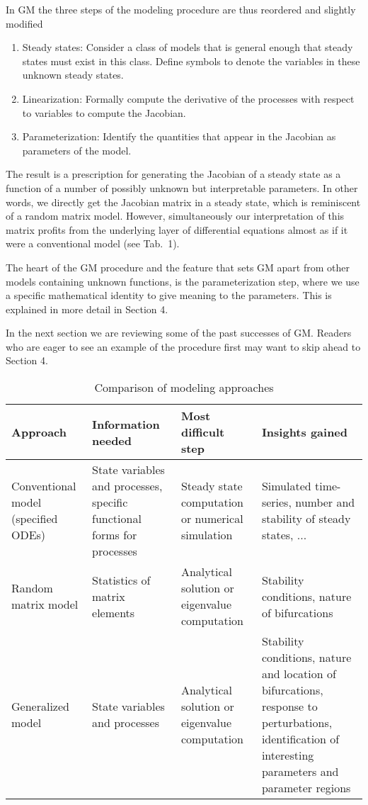 \documentclass{article}
\begin{document}
In GM the three steps of the modeling procedure are thus reordered and slightly modified
\begin{enumerate}
\item Steady states: Consider a class of models that is general enough that steady states must exist in this class. Define symbols to denote the variables in these unknown steady states.
\item Linearization: Formally compute the derivative of the processes with respect to variables to compute the Jacobian.
\item Parameterization: Identify the quantities that appear in the Jacobian as parameters of the model. 
\end{enumerate}
The result is a prescription for generating the Jacobian of a steady state as a function of a number of possibly unknown but interpretable parameters. 
In other words, we directly get the Jacobian matrix in a steady state, which is reminiscent of a random matrix model. However, simultaneously our interpretation of this matrix profits from the underlying layer of differential equations almost as if it were a conventional model (see Tab.~1).

The heart of the GM procedure and the feature that sets GM apart from other models containing unknown functions, is the parameterization step, where we use a specific mathematical identity to give meaning to the parameters. This is explained in more detail in Section 4.

In the next section we are reviewing some of the past successes of GM. Readers who are eager to see an example of the procedure first may want to skip ahead to Section 4. 

\begin{table}
\caption{Comparison of modeling approaches}
\footnotesize
\begin{tabularx}{\textwidth} { 
  | >{\raggedright\arraybackslash}X 
  | >{\raggedright\arraybackslash}X 
  | >{\raggedright\arraybackslash}X 
  | >{\raggedright\arraybackslash}X |}\hline
Approach & Information needed & Most difficult step & Insights gained \\\hline
Conventional model (specified ODEs) & State variables and processes, specific functional forms for processes & Steady state computation or numerical simulation & Simulated time-series, number and stability of steady states, ...  \\
Random matrix model & Statistics of matrix elements & Analytical solution or eigenvalue computation & Stability conditions, nature of bifurcations \\
Generalized model & State variables and processes & Analytical solution or eigenvalue computation & Stability conditions, nature and location of bifurcations, response to perturbations, identification of interesting parameters and parameter regions
\\\hline
\end{tabularx}
\end{table}
\end{document}
